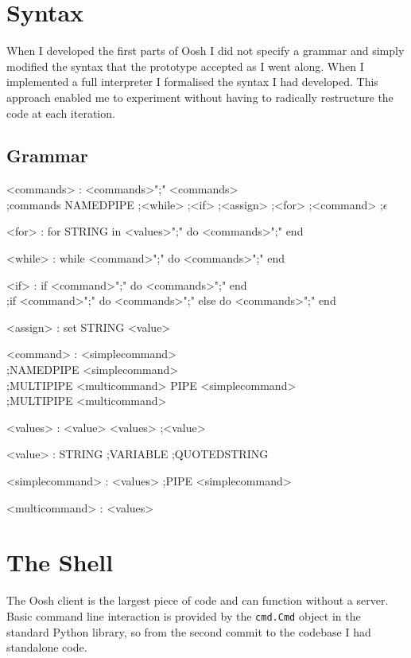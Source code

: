 \documentclass[12pt,twoside,notitlepage]{report}
\begin{document}
\section{Syntax}
When I developed the first parts of Oosh I did not specify a grammar and simply
modified the syntax that the prototype accepted as I went along. When I
implemented a full interpreter I formalised the syntax I had developed. This
approach enabled me to experiment without having to radically restructure the
code at each iteration.

\subsection{Grammar}
\begin{grammar}
<commands> : <commands>";" <commands>\\
;commands NAMEDPIPE
;<while>
;<if>
;<assign>
;<for>
;<command>
;$\epsilon$

<for> : for STRING in <values>";" do <commands>";" end

<while> : while <command>";" do <commands>";" end

<if> : if <command>";" do <commands>";" end\\
;if <command>";" do <commands>";" else do <commands>";" end

<assign> : set STRING <value>

<command> : <simplecommand>\\
;NAMEDPIPE <simplecommand>\\
;MULTIPIPE <multicommand> PIPE <simplecommand>\\
;MULTIPIPE <multicommand>

<values> : <value> <values>
;<value>

<value> : STRING
;VARIABLE
;QUOTEDSTRING

<simplecommand> : <values>
;PIPE <simplecommand>
    
<multicommand> : <values>
\end{grammar}

\section{The Shell}
The Oosh client is the largest piece of code %
and can function without a server. Basic command line interaction is provided by
the {\tt cmd.Cmd} object in the standard Python library, so from the second
commit to the codebase I had standalone code. %
\end{document}
